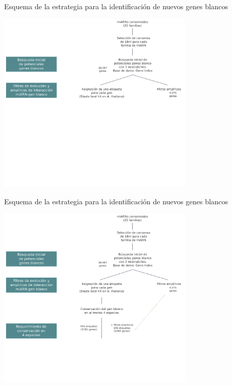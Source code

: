 \documentclass{beamer}
\begin{document}
\begin{frame}{Esquema de la estrategia para la identificación de nuevos genes blancos}
	\begin{center}
		\includegraphics[width=0.7\textwidth]{img/NAR_fig01_02.png}
	\end{center}
\end{frame}


\begin{frame}{Esquema de la estrategia para la identificación de nuevos genes blancos}
	\begin{center}
		\includegraphics[width=0.7\textwidth]{img/NAR_fig01_03.png}
	\end{center}
\end{frame}
\end{document}
